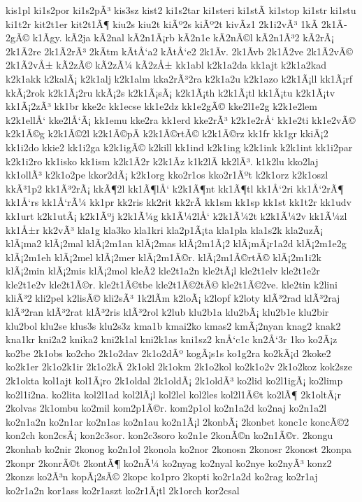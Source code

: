 {kis1pl
ki1s2por
ki1s2pÃ³
kis3sz
kist2
ki1s2tar
ki1steri
ki1stÃ­
ki1stop
ki1str
ki1stu
ki1t2r
kit2t1er
kit2t1Ã¶
kiu2s
kiu2t
kiÃº2s
kiÃº2t
kivÃ­z1
2k1i2vÃ³
1kÃ­
2k1Ã­2gÃ©
k1Ã­gy.
kÃ­2ja
kÃ­2nal
kÃ­2n1Ã¡rb
kÃ­2n1e
kÃ­2nÃ©l
kÃ­2n1Ã³2
kÃ­2rÃ¡
2k1Ã­2re
2k1Ã­2rÃ³
2kÃ­tm
kÃ­tÅ‘a2
kÃ­tÅ‘e2
2k1Ã­v.
2k1Ã­vb
2k1Ã­2ve
2k1Ã­2vÃ©
2k1Ã­2vÅ±
kÃ­2zÃ©
kÃ­2zÃ¼
kÃ­2zÅ±
kk1abl
k2k1a2da
kk1ajt
k2k1a2kad
k2k1akk
k2kalÃ¡
k2k1alj
k2k1alm
kka2rÃ³2ra
k2k1a2u
k2k1azo
k2k1Ã¡ll
kk1Ã¡rf
kkÃ¡2rok
k2k1Ã¡2ru
kkÃ¡2s
k2k1Ã¡sÃ¡
k2k1Ã¡th
k2k1Ã¡tl
kk1Ã¡tu
k2k1Ã¡tv
kk1Ã¡2zÃ³
kk1br
kke2c
kk1ecse
kk1e2dz
kk1e2gÃ©
kke2l1e2g
k2k1e2lem
k2k1ellÅ‘
kke2lÅ‘Ã¡
kk1emu
kke2ra
kk1erd
kke2rÃ³
k2k1e2rÅ‘
kk1e2ti
kk1e2vÃ©
k2k1Ã©g
k2k1Ã©2l
k2k1Ã©pÃ­
k2k1Ã©rtÃ©
k2k1Ã©rz
kk1fr
kk1gr
kkiÃ¡2
kk1i2do
kkie2
kk1i2ga
k2k1igÃ©
k2kill
kk1ind
k2k1ing
k2k1ink
k2k1int
kk1i2par
k2k1i2ro
kk1isko
kk1ism
k2k1Ã­2r
k2k1Ã­z
k1k2lÃ­
kk2lÃ³.
k1k2lu
kko2laj
kk1ollÃ³
k2k1o2pe
kkor2dÃ¡
k2k1org
kko2r1os
kko2r1Ãºt
k2k1orz
k2k1oszl
kkÃ³1p2
kk1Ã³2rÃ¡
kkÃ¶2l
kk1Ã¶lÅ‘
k2k1Ã¶nt
kk1Ã¶tl
kk1Å‘2ri
kk1Å‘2rÃ¶
kk1Å‘rs
kk1Å‘rÃ¼
kk1pr
kk2ris
kk2rit
kk2rÃ­
kk1sm
kk1sp
kk1st
kk1t2r
kk1udv
kk1urt
k2k1utÃ¡
k2k1Ãºj
k2k1Ã¼g
kk1Ã¼2lÅ‘
k2k1Ã¼2t
k2k1Ã¼2v
kk1Ã¼zl
kk1Å±r
kk2vÃ³
kla1g
kla3ko
kla1kri
kla2p1Ã¡ta
kla1pla
kla1s2k
kla2uzÃ¡
klÃ¡ma2
klÃ¡2mal
klÃ¡2m1an
klÃ¡2mas
klÃ¡2m1Ã¡2
klÃ¡mÃ¡r1a2d
klÃ¡2m1e2g
klÃ¡2m1eh
klÃ¡2mel
klÃ¡2mer
klÃ¡2m1Ã©r.
klÃ¡2m1Ã©rtÃ©
klÃ¡2m1i2k
klÃ¡2min
klÃ¡2mis
klÃ¡2mol
kleÃ­2
kle2t1a2n
kle2tÃ¡l
kle2t1elv
kle2t1e2r
kle2t1e2v
kle2t1Ã©r.
kle2t1Ã©tbe
kle2t1Ã©2tÃ©
kle2t1Ã©2ve.
kle2tin
k2lini
kliÃ³2
kli2pel
k2lisÃ©
kli2sÃ³
1k2lÃ­m
k2loÃ¡
k2lopf
k2loty
klÃ³2rad
klÃ³2raj
klÃ³2ran
klÃ³2rat
klÃ³2ris
klÃ³2rol
k2lub
klu2b1a
klu2bÃ¡
klu2b1e
klu2bir
klu2bol
klu2se
klus3s
klu2s3z
kma1b
kmai2ko
kmas2
kmÃ¡2nyan
knag2
knak2
kna1kr
kni2a2
knika2
kni2k1al
kni2k1as
kni1sz2
knÅ‘c1c
kn2Å‘3r
1ko
ko2Ã¡z
ko2be
2k1obs
ko2cho
2k1o2dav
2k1o2dÃº
kogÃ¡s1s
ko1g2ra
ko2kÃ¡d
2koke2
ko2k1er
2k1o2k1ir
2k1o2kÃ­
2k1okl
2k1okm
2k1o2kol
ko2k1o2v
2k1o2koz
kok2sze
2k1okta
kol1ajt
kol1Ã¡ro
2k1oldal
2k1oldÃ¡
2k1oldÃ³
ko2lid
ko2l1igÃ¡
ko2limp
ko2l1i2na.
ko2lita
kol2l1ad
kol2lÃ¡l
kol2lel
kol2les
kol2l1Ã©t
ko2lÃ¶
2k1oltÃ¡r
2kolvas
2k1ombu
ko2mil
kom2p1Ã©r.
kom2p1ol
ko2n1a2d
ko2naj
ko2n1a2l
ko2n1a2n
ko2n1ar
ko2n1as
ko2n1au
ko2n1Ã¡l
2konbÃ¡
2konbet
konc1c
koncÃ©2
kon2ch
kon2csÃ¡
kon2c3sor.
kon2c3soro
ko2n1e
2konÃ©n
ko2n1Ã©r.
2kongu
2konhab
ko2nir
2konog
ko2n1ol
2konola
ko2nor
2konosn
2konosr
2konost
2konpa
2konpr
2konrÃ©t
2kontÃ¶
ko2nÃ¼
ko2nyag
ko2nyal
ko2nye
ko2nyÃ³
konz2
2konzs
ko2Ã³n
kopÃ¡2sÃ©
2kopc
ko1pro
2kopti
ko2r1a2d
ko2rag
ko2r1aj
ko2r1a2n
kor1ass
ko2r1aszt
ko2r1Ã¡tl
2k1orch
kor2csal
}
